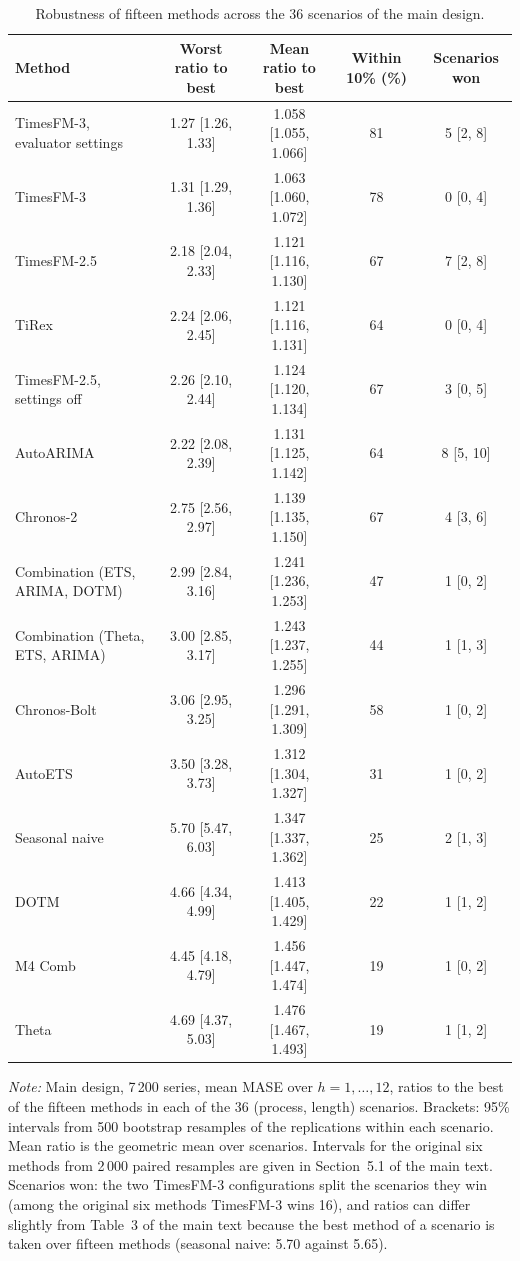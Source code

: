 \begin{table}[!htbp]
\centering
\begin{threeparttable}
\caption{Robustness of fifteen methods across the 36 scenarios of the main design.}
\label{tab:extended}
\small\setlength{\tabcolsep}{4pt}
\begin{tabular}{lcccc}
\toprule
Method & Worst ratio to best & Mean ratio to best & Within 10\% (\%) & Scenarios won \\
\midrule
TimesFM-3, evaluator settings & 1.27 [1.26, 1.33] & 1.058 [1.055, 1.066] & 81 & 5 [2, 8] \\
TimesFM-3 & 1.31 [1.29, 1.36] & 1.063 [1.060, 1.072] & 78 & 0 [0, 4] \\
TimesFM-2.5 & 2.18 [2.04, 2.33] & 1.121 [1.116, 1.130] & 67 & 7 [2, 8] \\
TiRex & 2.24 [2.06, 2.45] & 1.121 [1.116, 1.131] & 64 & 0 [0, 4] \\
TimesFM-2.5, settings off & 2.26 [2.10, 2.44] & 1.124 [1.120, 1.134] & 67 & 3 [0, 5] \\
AutoARIMA & 2.22 [2.08, 2.39] & 1.131 [1.125, 1.142] & 64 & 8 [5, 10] \\
Chronos-2 & 2.75 [2.56, 2.97] & 1.139 [1.135, 1.150] & 67 & 4 [3, 6] \\
Combination (ETS, ARIMA, DOTM) & 2.99 [2.84, 3.16] & 1.241 [1.236, 1.253] & 47 & 1 [0, 2] \\
Combination (Theta, ETS, ARIMA) & 3.00 [2.85, 3.17] & 1.243 [1.237, 1.255] & 44 & 1 [1, 3] \\
Chronos-Bolt & 3.06 [2.95, 3.25] & 1.296 [1.291, 1.309] & 58 & 1 [0, 2] \\
AutoETS & 3.50 [3.28, 3.73] & 1.312 [1.304, 1.327] & 31 & 1 [0, 2] \\
Seasonal naive & 5.70 [5.47, 6.03] & 1.347 [1.337, 1.362] & 25 & 2 [1, 3] \\
DOTM & 4.66 [4.34, 4.99] & 1.413 [1.405, 1.429] & 22 & 1 [1, 2] \\
M4 Comb & 4.45 [4.18, 4.79] & 1.456 [1.447, 1.474] & 19 & 1 [0, 2] \\
Theta & 4.69 [4.37, 5.03] & 1.476 [1.467, 1.493] & 19 & 1 [1, 2] \\
\bottomrule
\end{tabular}
\begin{tablenotes}[flushleft]\footnotesize
\item \textit{Note:} Main design, 7\,200 series, mean MASE over $h = 1, \dots, 12$, ratios to the best of the fifteen methods in each of the 36 (process, length) scenarios. Brackets: 95\% intervals from 500 bootstrap resamples of the replications within each scenario. Mean ratio is the geometric mean over scenarios. Intervals for the original six methods from 2\,000 paired resamples are given in Section~5.1 of the main text. Scenarios won: the two TimesFM-3 configurations split the scenarios they win (among the original six methods TimesFM-3 wins 16), and ratios can differ slightly from Table~3 of the main text because the best method of a scenario is taken over fifteen methods (seasonal naive: 5.70 against 5.65).
\end{tablenotes}
\end{threeparttable}
\end{table}
